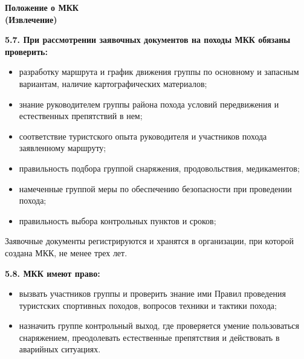 \documentclass[a5paper, 12pt, twoside]{article}
\begin{document}
\newpage %

    \strut

\newpage %

    {\centering%
    \textbf{Положение о МКК\\
    (Извлечение)}\par}
    \vspace{1cm}

    \textbf{5.7. При рассмотрении заявочных документов на походы МКК обязаны
    проверить:}

    \begin{itemize}[itemsep=2pt, leftmargin=1.1cm, label=$\triangleright$]
        \item разработку маршрута и график движения группы по основному и запасным вариантам,
        наличие картографических материалов;
        \item знание руководителем группы района похода условий передвижения и естественных препятствий в нем;
        \item соответствие туристского опыта руководителя и участников похода заявленному маршруту;
        \item правильность подбора группой снаряжения, продовольствия, медикаментов;
        \item намеченные группой меры по обеспечению безопасности при проведении похода;
        \item правильность выбора контрольных пунктов и сроков;
    \end{itemize}

    Заявочные документы регистрируются и хранятся в организации, при которой создана МКК, не менее трех лет.
    \vspace{0.5cm}

    \textbf{5.8. МКК имеют право:}

    \begin{itemize}[itemsep=2pt, leftmargin=1.1cm, label=$\triangleright$]
        \item вызвать участников группы и проверить знание ими Правил проведения туристских
        спортивных походов, вопросов техники и тактики похода;
        \item назначить группе контрольный выход, где проверяется умение пользоваться снаряжением,
        преодолевать естест\-венные препятствия и действовать в аварийных ситуациях.
    \end{itemize}

\newpage %

\strut

\newpage %


\newpage %

\strut

\newpage %

\strut
\end{document}
